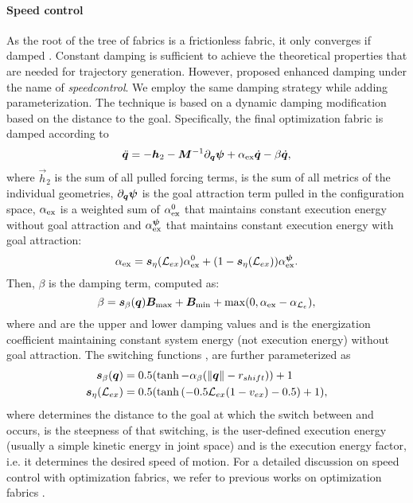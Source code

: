 \paragraph{Speed control}
%
As the root of the tree of fabrics is a frictionless fabric, it only converges if damped \cite{Ratliff2020}. 
Constant damping is sufficient to achieve the theoretical properties that are needed for trajectory generation.
However, \cite{Ratliff2020,Wyk2022,Ratliff2021} proposed enhanced damping under the name of \textit{speedcontrol}. 
We employ the same damping strategy while adding parameterization. The technique is based on a
dynamic damping modification based on the distance to the goal. Specifically, the final optimization fabric
is damped according to 
\[
    \ddot{\bm{q}} = -\bm{h}_2 - \bm{M}^{-1}\partial_{\bm{q}}\bm{\psi} + \alpha_{\textrm{ex}}\dot{\bm{q}} - \beta\dot{\bm{q}}, 
\]
where $\vec{h}_2$ is the sum of all pulled forcing terms, \M{} is the sum of 
all metrics of the individual geometries,
$\partial_{\bm{q}}\bm{\psi}$ is the goal attraction term pulled in the configuration space, 
$\alpha_{\textrm{ex}}$ is a weighted sum of $\alpha_{\textrm{ex}}^0$
that maintains constant execution energy without goal attraction
and $\alpha_{\textrm{ex}}^{\bm{\psi}}$ that maintains constant execution
energy with goal attraction:
\[
    \alpha_{\textrm{ex}} = {\bm{s}_{\eta}(\mathcal{L}_{ex})}\alpha_{\textrm{ex}}^0 + (1-{\bm{s}_{\eta}(\mathcal{L}_{ex})})\alpha_{\textrm{ex}}^{\bm{\psi}}.
\]
%
Then, $\beta$ is the damping term, computed as:
\[
    \beta = {\bm{s}_{\beta}(\bm{q})}\bm{B}_{\textrm{max}} + \bm{B}_{\textrm{min}} + \max(0, \alpha_{\textrm{ex}} - \alpha_{\mathcal{L}_e}),
\]
where \Bmax{} and \Bmin{} are the upper and lower damping values and
\alphale{} is the energization coefficient maintaining
constant system energy (not execution energy) without goal attraction. 
The switching functions \switching{\beta}{\q}, \switching{\eta}{\q} are further parameterized as
\begin{align*}
    {\ensuremath{\bm{s}}_{\beta}(\ensuremath{\bm{q}})} &= 0.5(\tanh{-\ensuremath{\alpha_{\beta}}(\lVert\ensuremath{\bm{q}}\rVert - \ensuremath{r_{shift}})) + 1}\\
    {\bm{s}_{\eta}(\mathcal{L}_{ex})} &= 0.5(\tanh{\left(-0.5 \ensuremath{\mathcal{L}_{ex}}(1 - \ensuremath{v_{ex}}) - 0.5\right)} + 1),
\end{align*}
where \radiusshift{} determines the distance to the goal at which the switch between \Bmin{} and \Bmax{} occurs,
\alphab{} is the steepness of that switching, \lex{} is the user-defined execution energy (usually a simple
kinetic energy in joint space) and \exfactor{} is the execution energy factor, i.e. it determines the desired speed
of motion.
For a detailed discussion on speed control with optimization fabrics, we refer
to previous works on optimization fabrics \cite{Wyk2022,Ratliff2020}.

